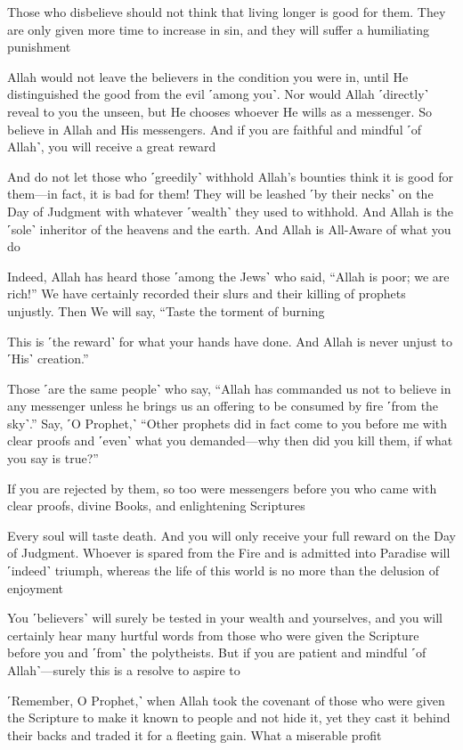 Those who disbelieve should not think that living longer is good for them. They are only given more time to increase in sin, and they will suffer a humiliating punishment

Allah would not leave the believers in the condition you were in, until He distinguished the good from the evil ˹among you˺. Nor would Allah ˹directly˺ reveal to you the unseen, but He chooses whoever He wills as a messenger. So believe in Allah and His messengers. And if you are faithful and mindful ˹of Allah˺, you will receive a great reward

And do not let those who ˹greedily˺ withhold Allah’s bounties think it is good for them—in fact, it is bad for them! They will be leashed ˹by their necks˺ on the Day of Judgment with whatever ˹wealth˺ they used to withhold. And Allah is the ˹sole˺ inheritor of the heavens and the earth. And Allah is All-Aware of what you do

Indeed, Allah has heard those ˹among the Jews˺ who said, “Allah is poor; we are rich!” We have certainly recorded their slurs and their killing of prophets unjustly. Then We will say, “Taste the torment of burning

This is ˹the reward˺ for what your hands have done. And Allah is never unjust to ˹His˺ creation.”

Those ˹are the same people˺ who say, “Allah has commanded us not to believe in any messenger unless he brings us an offering to be consumed by fire ˹from the sky˺.” Say, ˹O Prophet,˺ “Other prophets did in fact come to you before me with clear proofs and ˹even˺ what you demanded—why then did you kill them, if what you say is true?”

If you are rejected by them, so too were messengers before you who came with clear proofs, divine Books, and enlightening Scriptures

Every soul will taste death. And you will only receive your full reward on the Day of Judgment. Whoever is spared from the Fire and is admitted into Paradise will ˹indeed˺ triumph, whereas the life of this world is no more than the delusion of enjoyment

You ˹believers˺ will surely be tested in your wealth and yourselves, and you will certainly hear many hurtful words from those who were given the Scripture before you and ˹from˺ the polytheists. But if you are patient and mindful ˹of Allah˺—surely this is a resolve to aspire to

˹Remember, O Prophet,˺ when Allah took the covenant of those who were given the Scripture to make it known to people and not hide it, yet they cast it behind their backs and traded it for a fleeting gain. What a miserable profit

